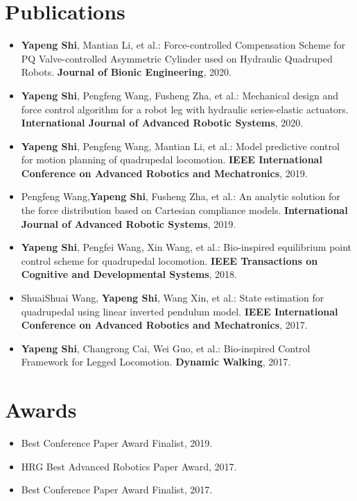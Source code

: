 \documentclass[letterpaper,11pt]{article}
\begin{document}
\section{Publications}
\begin{itemize}
	\setlength{\itemsep}{0pt}
	\setlength{\parsep}{0pt}
	\setlength{\parskip}{4pt}
\justifying	\item \textbf{Yapeng Shi}, Mantian Li, et al.: Force-controlled Compensation Scheme for PQ Valve-controlled Asymmetric Cylinder used on Hydraulic Quadruped Robots. \textbf{Journal of Bionic Engineering}, 2020.
	
\justifying	\item \textbf{Yapeng Shi}, Pengfeng Wang, Fusheng Zha, et al.: Mechanical design and force control algorithm for a robot leg with hydraulic series-elastic actuators. \textbf{International Journal of Advanced Robotic Systems}, 2020.
\justifying	\item \textbf{Yapeng Shi}, Pengfeng Wang, Mantian Li, et al.: Model predictive control for motion planning of quadrupedal locomotion. \textbf{IEEE International Conference on Advanced Robotics and Mechatronics}, 2019.
\justifying	\item Pengfeng Wang,\textbf{Yapeng Shi}, Fusheng Zha, et al.: An analytic solution for the force distribution based on Cartesian compliance models. \textbf{International Journal of Advanced Robotic Systems}, 2019.

\justifying	\item \textbf{Yapeng Shi}, Pengfei Wang, Xin Wang, et al.: Bio-inspired equilibrium point control scheme for quadrupedal locomotion. \textbf{IEEE Transactions on Cognitive and Developmental Systems}, 2018.

\justifying	\item ShuaiShuai Wang, \textbf{Yapeng Shi}, Wang Xin, et al.: State estimation for quadrupedal using linear inverted pendulum model. \textbf{IEEE International Conference on Advanced Robotics and Mechatronics}, 2017.

\justifying	\item \textbf{Yapeng Shi}, Changrong Cai, Wei Guo, et al.: Bio-inspired Control Framework for Legged Locomotion. \textbf{Dynamic Walking}, 2017.

\end{itemize}

\vspace{-7mm}
\section{Awards}
\begin{itemize}
	\setlength{\itemsep}{0pt}
	\setlength{\parsep}{0pt}
	\setlength{\parskip}{4pt}
\item Best Conference Paper Award Finalist, 2019.
\item HRG Best Advanced Robotics Paper Award, 2017.
\item Best Conference Paper Award Finalist, 2017.
\end{itemize}
\end{document}
